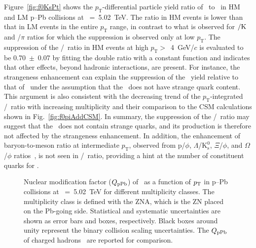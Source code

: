 Figure~\ref{fig:f0KsPt} shows the $p_{\mathrm{T}}$-differential particle yield ratio of \fzero~to \kstar~in HM and LM p--Pb collisions at \snn~=~5.02~TeV. The ratio in HM events is lower than that in LM events in the entire $p_{\mathrm{T}}$ range, in contrast to what is observed for \kstar$\rm{}/K$ and \fzero/$\pi$ ratios for which the suppression is observed only at low $p_{\mathrm{T}}$. The suppression of the \fzero/\kstar~ratio in HM events at high $p_{\mathrm{T}}>$~4~GeV/$c$ is evaluated to be 0.70~$\pm$~0.07 by fitting the double ratio with a constant function and indicates that other effects, beyond hadronic interactions, are present. For instance, the strangeness enhancement can explain the suppression of the \fzero~yield relative to that of \kstar~under the assumption that the \fzero~does not have strange quark content. This argument is also consistent with the decreasing trend of the $p_{\mathrm{T}}$-integrated \fzero/\kstar~ratio with increasing multiplicity and their comparison to the CSM calculations shown in Fig.~\ref{fig:f0piAddCSM}. In summary, the suppression of the \fzero/\kstar~ratio may suggest that the \fzero~does not contain strange quarks, and its production is therefore not affected by the strangeness enhancement. In addition, the enhancement of baryon-to-meson ratio at intermediate $p_{\mathrm{T}}$, observed from p/$\phi$, $\Lambda$/$\mathrm{K}_{\mathrm{s}}^{0}$, $\Xi$/$\phi$, and $\Omega$/$\phi$ ratios~\cite{ALICE:2020jsh}, is not seen in \fzero/\kstar~ratio, providing a hint at the number of constituent quarks for \fzero.

\begin{figure}[!hbt]
	\centering
	\caption{ Nuclear modification factor ($Q_{\rm{pPb}}$) of \fzero~as a function of $p_{\rm{T}}$ in p--Pb collisions at \snn~=~5.02~TeV for different multiplicity classes. The multiplicity class is defined with the ZNA, which is the ZN placed on the Pb-going side. Statistical and systematic uncertainties are shown as error bars and boxes, respectively. Black boxes around unity represent the binary collision scaling uncertainties. The $Q_{\rm{pPb}}$ of charged hadrons~\cite{ALICE:2014xsp} are reported for comparison. }
	\label{fig:QpPb}
\end{figure}

